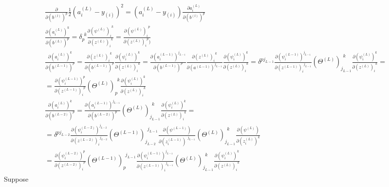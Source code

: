\documentclass[10pt]{amsart}
\begin{document}
\begin{multicols*}{2}
\[
\begin{gathered}
\begin{aligned}
& \frac{ \partial }{ \partial (b^{(l)})^p} \frac{1}{2} (a_i^{(L)} - y_{(i)})^2 = (a_i^{(L)} - y_{(i)} ) \frac{ \partial a_i^{(L)} }{ \partial (b^{(l)})^p } \\
& \frac{ \partial ( a_i^{(L)})^k }{ \partial (b^{(L)})^p}  = \delta_p^{\  \  k} \frac{ \partial ( \psi^{(L)})_i^{\  \  k} }{ \partial (z^{(L)})_i^{\  \  k} } = \frac{ \partial ( \psi^{(L)})_i^{\  \  p} }{ \partial (z^{(L)})_i^{\  \  p})}  \\
 & \frac{ \partial ( a_i^{(L)})^k }{ \partial (b^{(L-1)})^p} = \frac{ \partial (z^{(L)})_i^{\  \  k} }{ \partial ( b^{(L-1)})^p} \frac{\partial (\psi^{(L)}_i)^k }{ \partial (z^{(L)})_i^{\  \  k} } = \frac{ \partial (a_i^{(L-1)})^{j_{L-1}} }{ \partial (b^{(L-1)})^p }  \frac{ \partial (z^{(L)})_i^{\  \  k} }{ \partial ( a^{(L-1)})^{j_{L-1}}  }\frac{\partial (\psi^{(L)}_i)^k }{ \partial (z^{(L)})_i^{\  \  k} }  =  \delta^{p j_{L-1}} \frac{ \partial ( \psi_i^{(L-1)})^{j_{L-1}} }{ \partial (z^{(L-1)})_i^{\  \  j_{L-1} } }  ( \Theta^{(L)})_{j_{L-1}}^{\  \  k}   \frac{\partial (\psi^{(L)}_i)^k }{ \partial (z^{(L)})_i^{\  \  k} } = \\
 & = \frac{ \partial ( \psi_i^{(L-1)})^{ p } }{ \partial (z^{(L-1)})_i^{\  \  p } }  ( \Theta^{(L)})_{ p }^{\  \  k}   \frac{\partial (\psi^{(L)}_i)^k }{ \partial (z^{(L)})_i^{\  \  k} }   \\
& \frac{ \partial ( a_i^{(L)})^k }{ \partial (b^{(L-2)})^p} = \frac{ \partial (a_i^{(L-1)})^{j_{L-1}} }{ \partial (b^{(L-2)})^p }  (\Theta^{(L)})_{j_{L-1}}^{\  \  k}  \frac{\partial (\psi^{(L)}_i)^k }{ \partial (z^{(L)})_i^{\  \  k} }  = \\
& = \delta^{p j_{L-2}} \frac{ \partial ( \psi_i^{(L-2)})^{j_{L-2}} }{ \partial (z^{(L-2)})_i^{\  \  j_{L-2} } }  ( \Theta^{(L-1)})_{j_{L-2}}^{\  \  j_{L-1}}   \frac{\partial (\psi^{(L-1)}) }{ \partial (z_i^{(L-1)})^{\  \  j_{L-1}} }   (\Theta^{(L)})_{j_{L-1}}^{\  \  k}  \frac{\partial (\psi^{(L)}) }{ \partial (z_i^{(L)})^{k} } \\
& = \frac{ \partial ( \psi_i^{(L-2)})^{ p } }{ \partial (z^{(L-2)})_i^{\  \  p } }  ( \Theta^{(L-1)})_{ p }^{\  \  j_{L-1}}    \frac{\partial (\psi^{(L-1)}_i)^{j_{L-1}} }{ \partial (z^{(L-1)})_i^{\  \  j_{L-1}} }   (\Theta^{(L)})_{j_{L-1}}^{\  \  k}  \frac{\partial (\psi^{(L)}_i)^k }{ \partial (z^{(L)})_i^{\  \  k} }
\end{aligned}
\end{gathered}
\]
Suppose 
\begin{equation}

\end{equation}
\end{multicols*}
\end{document}
